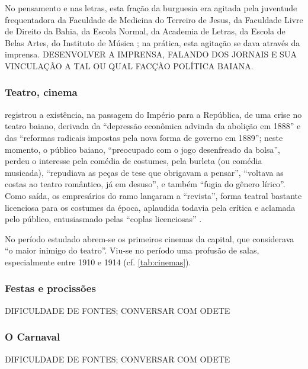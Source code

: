 No pensamento e nas letras, esta fração da burguesia era agitada pela juventude frequentadora da Faculdade de Medicina do Terreiro de Jesus, da Faculdade Livre de Direito da Bahia, da Escola Normal, da Academia de Letras, da Escola de Belas Artes, do Instituto de Música \cite[p.~272]{machadoneto_bahiaint_1972}; na prática, esta agitação se dava através da imprensa. DESENVOLVER A IMPRENSA, FALANDO DOS JORNAIS E SUA VINCULAÇÃO A TAL OU QUAL FACÇÃO POLÍTICA BAIANA.

\subsubsection{Teatro, cinema}\label{subsubsec:teacinbasa}

 registrou a existência, na passagem do Império para a República, de uma crise no teatro baiano, derivada da ``depressão econômica advinda da abolição em 1888'' e das ``reformas radicais impostas pela nova forma de governo em 1889''; neste momento, o público baiano, ``preocupado com o jogo desenfreado da bolsa'', perdeu o interesse pela comédia de costumes, pela burleta (ou comédia musicada), ``repudiava as peças de tese que obrigavam a pensar'', ``voltava as costas ao teatro romântico, já em desuso'', e também ``fugia do gênero lírico''. Como saída, os empresários do ramo lançaram a ``revista'', forma teatral bastante licenciosa para os costumes da época, aplaudida todavia pela crítica e aclamada pelo público, entusiasmado pelas ``coplas licenciosas'' \cite[p.~48-49]{ruy_teatro_1959}.

No período estudado abrem-se os primeiros cinemas da capital, que  considerava ``o maior inimigo do teatro''. Viu-se no período uma profusão de salas, especialmente entre 1910 e 1914 (cf. \autoref{tab:cinemas}).



\subsubsection{Festas e procissões}\label{subsubsec:fesprobasa}

DIFICULDADE DE FONTES; CONVERSAR COM ODETE

\subsubsection{O Carnaval}\label{subsubsec:carnabasa}

DIFICULDADE DE FONTES; CONVERSAR COM ODETE